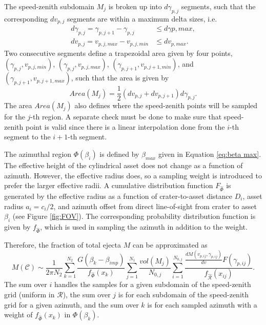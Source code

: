 \documentclass{article}
\begin{document}
The speed-zenith subdomain $M_j$ is broken up into $d\gamma_{p,j}$ segments, such that the corresponding $dv_{p,j}$ segments are within a maximum delta sizes, i.e.\
\begin{align}
d\gamma_{p,j} = \gamma_{p,j+1} - \gamma_{p,j} &\le d\gamma{p,max},\\
dv_{p,j} = v_{p,j,max} - v_{p,j,min} &\le dv_{p,max}.
\end{align}
Two consecutive segments define a trapezoidal area given by four points, $(\gamma_{p,j}, v_{p,j,min})$, $(\gamma_{p,j}, v_{p,j,max})$,  $(\gamma_{p,j+1}, v_{p,j+1,min})$, and $(\gamma_{p,j+1}, v_{p,j+1,max})$, such that the area is given by
\begin{equation}
Area(M_j) = \frac{1}{2}(dv_{p,j} + dv_{p,j+1})d\gamma_{p,j}.
\end{equation}
The area $Area(M_j)$ also defines where the speed-zenith points will be sampled for the $j$-th region. A separate check must be done to make sure that speed-zenith point is valid since there is a linear interpolation done from the $i$-th segment to the $i+1$-th segment.

The azimuthal region $\Phi(\beta_i)$ is defined by $\beta_{max}$ given in Equation \eqref{eq:beta max}. The effective height of the cylindrical asset does not change as a function of azimuth. However, the effective radius does, so a sampling weight is introduced to prefer the larger effective radii. A cumulative distribution function $F_{\hat{\Phi}}$ is generated by the effective radius as a function of crater-to-asset distance $D_i$, asset radius $a_i = c_i/2$, and azimuth offset from direct line-of-sight from crater to asset $\beta_i$ (see Figure \ref{fig:FOV}). The corresponding probability distribution function is given by $f_{\hat{\Phi}}$, which is used in sampling the azimuth in addition to the weight.

Therefore, the fraction of total ejecta $M$ can be approximated as
\begin{equation}
M(\mathcal{C}) \sim \frac{1}{2\pi N_2}\sum_{k=1}^{N_2}\frac{G(\beta_k-\beta_{imp})}{f_{\hat{\Phi}}(x_k)}\sum_{j=1}^{N_1}\frac{vol(M_j)}{N_{0,j}}\sum_{i=1}^{N_{0,j}}\frac{\frac{dM(v_{p,ij},\gamma_{p,ij})}{dv} F(\gamma_{p,ij}) }{f_{\hat{\mathcal{R}}}(x_{ij})}.
\end{equation}
The sum over $i$ handles the samples for a given subdomain of the speed-zenith grid (uniform in $\mathcal{R}$), the sum over $j$ is for each subdomain of the speed-zenith grid for a given azimuth, and the sum over $k$ is for each sampled azimuth with a weight of $f_{\hat{\Phi}}(x_k)$ in $\Phi(\beta_k)$.
\end{document}
